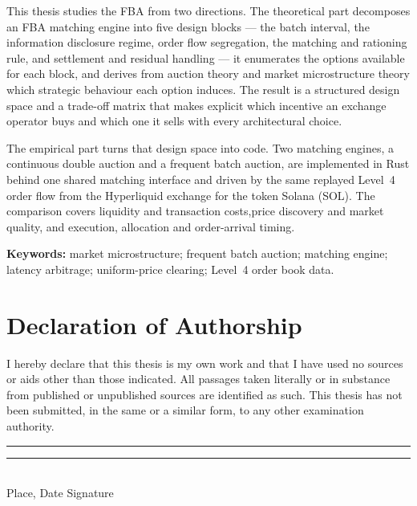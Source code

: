 This thesis studies the FBA from two directions. The theoretical part
decomposes an FBA matching engine into five design blocks --- the batch
interval, the information disclosure regime, order flow segregation,
the matching and rationing rule, and settlement and residual handling
---  it enumerates the options available for each block, and derives from
auction theory and market microstructure theory which strategic
behaviour each option induces. The result is a structured design space
and a trade-off matrix that makes explicit which incentive an exchange
operator buys and which one it sells with every architectural choice.

The empirical part turns that design space into code. Two matching
engines, a continuous double auction and a frequent batch auction, are
implemented in Rust behind one shared matching interface and driven by
the same replayed Level~4 order flow from the Hyperliquid exchange for the token Solana (SOL). The comparison covers liquidity and transaction costs,price discovery and market quality, and execution, allocation and
order-arrival timing.

\vspace{0.6em}
\noindent\textbf{Keywords:} market microstructure; frequent batch
auction; matching engine; latency arbitrage; uniform-price clearing;
Level~4 order book data.

\chapter*{Declaration of Authorship}

I hereby declare that this thesis is my own work and that I have used no
sources or aids other than those indicated. All passages taken
literally or in substance from published or unpublished sources are
identified as such. This thesis has not been submitted, in the same or
a similar form, to any other examination authority.

\vspace{2.5cm}
\noindent\rule{6cm}{0.4pt}\hspace{2cm}\rule{6cm}{0.4pt}\\
\noindent Place, Date \hspace{7.2cm} Signature

\cleardoublepage
\tableofcontents
\cleardoublepage
{}
\listoffigures
\cleardoublepage
{}
\listoftables


